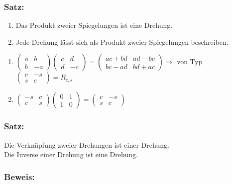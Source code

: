 \subsubsection{Satz:}
\begin{enumerate}
	\item Das Produkt zweier Spiegelungen ist eine Drehung.
	\item Jede Drehung lässt sich als Produkt zweier Spiegelungen beschreiben.
\end{enumerate}
\begin{enumerate}
	\item $ \begin{pmatrix} a & b \\ b & -a \end{pmatrix}  \begin{pmatrix} c & d \\ d & -c \end{pmatrix} = \begin{pmatrix} ac+bd & ad-bc \\ bc-ad & bd+ac \end{pmatrix} \Rightarrow$ von Typ $ \begin{pmatrix} c & -s \\ s & c \end{pmatrix} = R_{c,s}$
	\item $\begin{pmatrix} -s & c \\ c & s \end{pmatrix} \begin{pmatrix} 0 & 1 \\ 1 & 0 \end{pmatrix} = \begin{pmatrix} c  & -s \\ s & c \end{pmatrix}$
\end{enumerate}
%
%
%
\subsubsection{Satz:}
Die Verknüpfung zweier Drehungen ist einer Drehung. \\
Die Inverse einer Drehung ist eine Drehung. 
%
%
%
%
\subsubsection{Beweis:}
